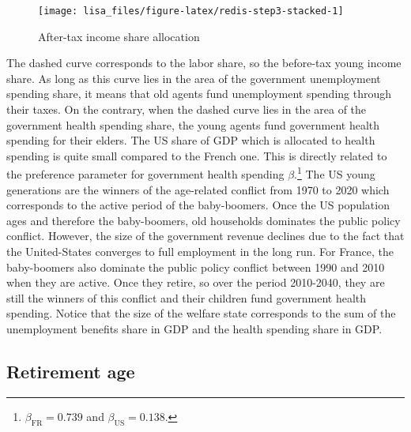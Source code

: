 \documentclass[
]{article}
\begin{document}
\begin{figure}[!tb]

{\centering \texttt{[image: lisa\_files/figure-latex/redis-step3-stacked-1]} 

}

\caption{After-tax income share allocation}\label{fig:redis-step3-stacked}
\end{figure}

The dashed curve corresponds to the labor share, so the before-tax young income share. As long as this curve lies in the area of the government unemployment spending share, it means that old agents fund unemployment spending through their taxes. On the contrary, when the dashed curve lies in the area of the government health spending share, the young agents fund government health spending for their elders. The US share of GDP which is allocated to health spending is quite small compared to the French one. This is directly related to the preference parameter for government health spending \(\beta\).\footnote{\(\beta_{\text{FR}} = 0.739\) and \(\beta_{\text{US}} = 0.138\).} The US young generations are the winners of the age-related conflict from 1970 to 2020 which corresponds to the active period of the baby-boomers. Once the US population ages and therefore the baby-boomers, old households dominates the public policy conflict. However, the size of the government revenue declines due to the fact that the United-States converges to full employment in the long run. For France, the baby-boomers also dominate the public policy conflict between 1990 and 2010 when they are active. Once they retire, so over the period 2010-2040, they are still the winners of this conflict and their children fund government health spending. Notice that the size of the welfare state corresponds to the sum of the unemployment benefits share in GDP and the health spending share in GDP.

\hypertarget{retirement}{%
\subsection{Retirement age}\label{retirement}}
\end{document}
